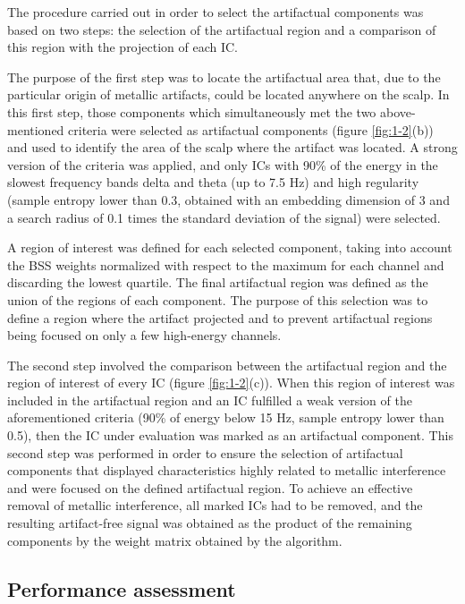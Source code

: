 The procedure carried out in order to select the artifactual components was based on two steps: the selection of the artifactual region and a comparison of this region with the projection of each IC.

The purpose of the first step was to locate the artifactual area that, due to the particular origin of metallic artifacts, could be located anywhere on the scalp. In this first step, those components which simultaneously met the two above-mentioned criteria were selected as artifactual components (figure \ref{fig:1-2}(b)) and used to identify the area of the scalp where the artifact was located. A strong version of the criteria was applied, and only ICs with 90\% of the energy in the slowest frequency bands delta and theta (up to 7.5 Hz) and high regularity (sample entropy lower than 0.3, obtained with an embedding dimension of 3 and a search radius of 0.1 times the standard deviation of the signal) were selected.

A region of interest was defined for each selected component, taking into account the BSS weights normalized with respect to the maximum for each channel and discarding the lowest quartile. The final artifactual region was defined as the union of the regions of each component. The purpose of this selection was to define a region where the artifact projected and to prevent artifactual regions being focused on only a few high-energy channels.

The second step involved the comparison between the artifactual region and the region of interest of every IC (figure \ref{fig:1-2}(c)). When this region of interest was included in the artifactual region and an IC fulfilled a weak version of the aforementioned criteria (90\% of energy below 15 Hz, sample entropy lower than 0.5), then the IC under evaluation was marked as an artifactual component. This second step was performed in order to ensure the selection of artifactual components that displayed characteristics highly related to metallic interference and were focused on the defined artifactual region. To achieve an effective removal of metallic interference, all marked ICs had to be removed, and the resulting artifact-free signal was obtained as the product of the remaining components by the weight matrix obtained by the algorithm.

\subsection{Performance assessment}

